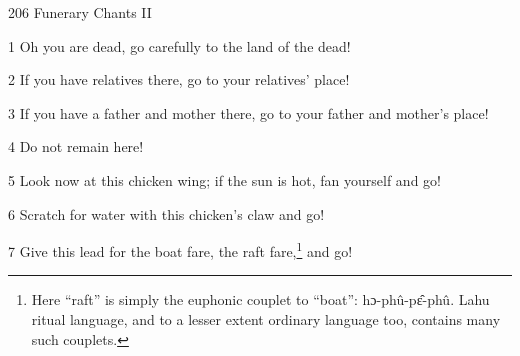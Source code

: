 
206 Funerary Chants II

1 Oh you are dead, go carefully to the land of the dead!

2 If you have relatives there, go to your relatives' place!

3 If you have a father and mother there, go to your father and mother's place!

4 Do not remain here!

5 Look now at this chicken wing; if the sun is hot, fan yourself and go!

6 Scratch for water with this chicken's claw and go!

7 Give this lead for the boat fare, the raft fare,\footnote{Here ``raft'' is simply the euphonic couplet to ``boat'': hɔ-phû-pɛ̂-phû. Lahu ritual language, and to a lesser extent ordinary language too, contains many such couplets.} and go!


